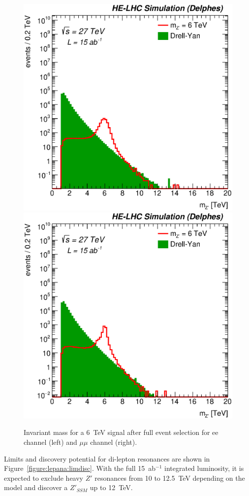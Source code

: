 \label{sec:lepana}
\begin{figure}[h]
  \centering
    \includegraphics[width=0.45\columnwidth]{Fig/Zpmumu_mzp_sel0_nostack_log.eps}
    \includegraphics[width=0.45\columnwidth]{Fig/Zpee_mzp_sel0_nostack_log.eps}
   \caption{Invariant mass for a 6~TeV signal after full event selection for ee channel (left) and $\mu\mu$ channel (right).}
  \label{figure:lepana:mass}
\end{figure}

Limits and discovery potential for di-lepton resonances are shown in Figure~\ref{figure:lepana:limdisc}. With the full 15~ab$^{-1}$ 
integrated luminosity, it is expected to exclude heavy $Z'$ resonances from 10 to 12.5~TeV depending on the model and discover 
a $Z'_{SSM}$ up to 12~TeV.

